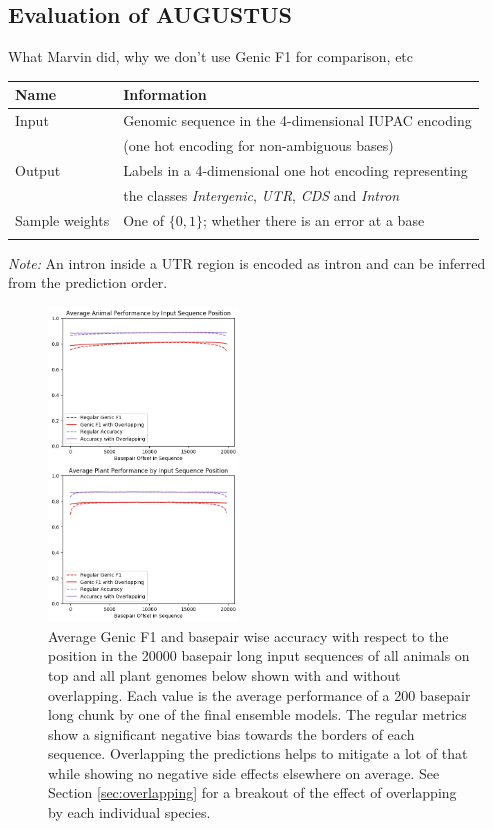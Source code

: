 \documentclass{bioinfo}
\begin{document}
\begin{methods}
\subsection{Evaluation of AUGUSTUS} 
\label{sec:augustus}
What Marvin did, why we don't use Genic F1 for comparison, etc


\begin{table}[!t]
 {
\begin{tabular}{@{}ll@{}}
\toprule Name & Information \\
\midrule
Input & Genomic sequence in the 4-dimensional IUPAC encoding\\
	  & (one hot encoding for non-ambiguous bases) \\
Output & Labels in a 4-dimensional one hot encoding representing \\
      & the classes {\it Intergenic}, {\it UTR}, {\it CDS} and {\it Intron}\\
Sample weights & One of $\{0,1\}$; whether there is an error at a base\\
\botrule
\end{tabular}}{{\it Note:} An intron inside a UTR region is encoded as intron and can be inferred from the prediction order.}
\end{table}

\end{methods}

\begin{figure}[!tpb]
\label{fig:length_wise_bias}
\centerline{\includegraphics[width=0.45\textwidth]{images/length_wise_bias}}
\caption{Average Genic F1 and basepair wise accuracy with respect to the position in the 20000 basepair long input sequences of all animals on top and all plant genomes below shown with and without overlapping. Each value is the average performance of a 200 basepair long chunk by one of the final ensemble models. The regular metrics show a significant negative bias towards the borders of each sequence. Overlapping the predictions helps to mitigate a lot of that while showing no negative side effects elsewhere on average. See Section \ref{sec:overlapping} for a breakout of the effect of overlapping by each individual species.}
\end{figure}
\end{document}
